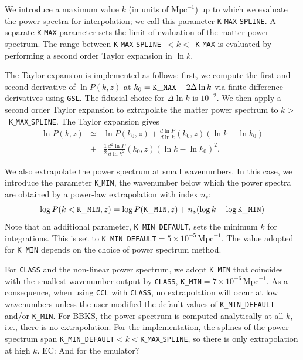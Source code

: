 \documentclass[\docopts]{\docclass}
\newcommand{\elisa}[1]{\textcolor{green!10!orange!90!}{EC: #1}}
\newcommand{\class}{{\tt CLASS}\xspace}
\begin{document}
We introduce a maximum value $k$ (in units of $\text{Mpc}^{-1}$) up to which we evaluate the power spectra for interpolation; we call this parameter {\tt K$\_$MAX$\_$SPLINE}. A separate {\tt K$\_$MAX} parameter sets the limit of evaluation of the matter power spectrum. The range between {\tt K$\_$MAX$\_$SPLINE}~$<k<$~{\tt K$\_$MAX} is evaluated by performing a second order Taylor expansion in $\ln k$.

The Taylor expansion is implemented as follows: first, we compute the first and second derivative of $\ln P(k,z)$ at $k_0={\rm \tt K\_MAX}-2\Delta\ln k$ via finite difference derivatives using {\tt GSL}. The fiducial choice for $\Delta\ln k$ is $10^{-2}$. We then apply a second order Taylor expansion to extrapolate the matter power spectrum to $k>$~{\tt K$\_$MAX$\_$SPLINE}. The Taylor expansion gives
%
\begin{eqnarray}
  \ln P(k,z) &\simeq& \ln P(k_0,z) + \frac{d\ln P}{d\ln k}(k_0,z) (\ln k-\ln k_0)  \nonumber\\
  &+& \frac{1}{2}  \frac{d^2\ln P}{d\ln k^2}(k_0,z) (\ln k-\ln k_0)^2.
  \label{eq:NLPSTaylor}
\end{eqnarray}

We also extrapolate the power spectrum at small wavenumbers. In this case, we introduce the parameter {\tt K$\_$MIN}, the wavenumber below which the power spectra are obtained by a power-law extrapolation with index $n_s$:
\begin{equation}
  \log P(k<{\tt K\_MIN},z) = \log P({\tt K\_MIN},z) + n_s (\log k-\log{\tt K\_MIN})
\end{equation}
Note that an additional parameter, {\tt K\_MIN\_DEFAULT}, sets the minimum $k$ for integrations. This is set to {\tt K\_MIN\_DEFAULT}$=5\times 10^{-5}\,\text{Mpc}^{-1}$. The value adopted for {\tt K\_MIN} depends on the choice of power spectrum method. 

For \class and the non-linear power spectrum, we adopt {\tt K\_MIN} that coincides with the smallest wavenumber output by \class, {\tt K\_MIN}$=7\times 10^{-6}\,\text{Mpc}^{-1}$. As a consequence, when using {\tt CCL} with \class, no extrapolation will occur at low wavenumbers unless the user modified the default values of {\tt K\_MIN\_DEFAULT} and/or {\tt K\_MIN}.
For BBKS, the power spectrum is computed analytically at all $k$, i.e., there is no extrapolation. For the \citet{1998ApJ...496..605E} implementation, the splines of the power spectrum span {\tt K\_MIN\_DEFAULT}$<k<${\tt K$\_$MAX$\_$SPLINE}, so there is only extrapolation at high $k$.
\elisa{And for the emulator?}
\end{document}
